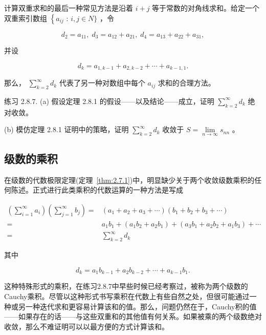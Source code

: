 计算双重求和的最后一种常见方法是沿着 \(i + j\) 等于常数的对角线求和。给定一个双重索引数组 \(\left\{  {a}_{ij}\right.\) : \(i,j \in  N\}\) ，令

\[
{d}_{2} = {a}_{11},\;{d}_{3} = {a}_{12} + {a}_{21},\;{d}_{4} = {a}_{13} + {a}_{22} + {a}_{31},
\]

并设

\[
{d}_{k} = {a}_{1,k - 1} + {a}_{2,k - 2} + \cdots  + {a}_{k - 1,1}.
\]

那么， \(\mathop{\sum }\limits_{{k = 2}}^{\infty }{d}_{k}\) 代表了另一种对数组中每个 \({a}_{ij}\) 求和的合理方法。

练习 2.8.7. (a) 假设定理 2.8.1 的假设——以及结论——成立，证明 \(\mathop{\sum }\limits_{{k = 2}}^{\infty }{d}_{k}\) 绝对收敛。

(b) 模仿定理 2.8.1 证明中的策略，证明 \(\mathop{\sum }\limits_{{k = 2}}^{\infty }{d}_{k}\) 收敛于 \(S = \mathop{\lim }\limits_{{n \rightarrow  \infty }}{s}_{nn}\) 。

\subsection{级数的乘积}

在级数的代数极限定理(定理~\ref{thm:2.7.1})中，明显缺少关于两个收敛级数乘积的任何陈述。正式进行此类乘积的代数运算的一种方法是写成

\begin{align*}
\left( {\mathop{\sum }\limits_{{i = 1}}^{\infty }{a}_{i}}\right) \left( {\mathop{\sum }\limits_{{j = 1}}^{\infty }{b}_{j}}\right)  = &\left( {{a}_{1} + {a}_{2} + {a}_{3} + \cdots }\right) \left( {{b}_{1} + {b}_{2} + {b}_{3} + \cdots }\right)\\
= &{a}_{1}{b}_{1} + \left( {{a}_{1}{b}_{2} + {a}_{2}{b}_{1}}\right)  + \left( {{a}_{3}{b}_{1} + {a}_{2}{b}_{2} + {a}_{1}{b}_{3}}\right)  + \cdots\\
= & \mathop{\sum }\limits_{{k = 2}}^{\infty }{d}_{k}
\end{align*}

其中

\[
{d}_{k} = {a}_{1}{b}_{k - 1} + {a}_{2}{b}_{k - 2} + \cdots  + {a}_{k - 1}{b}_{1}.
\]

这种特殊形式的乘积，在练习2.8.7中早些时候已经考察过，被称为两个级数的Cauchy乘积。尽管以这种形式书写乘积在代数上有些自然之处，但很可能通过一种或另一种迭代求和更容易计算该和的值。那么，问题仍然在于，Cauchy积的值——如果存在的话——与这些双重和的其他值有何关系。如果被乘的两个级数绝对收敛，那么不难证明可以以最方便的方式计算该和。

